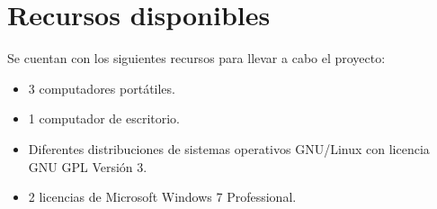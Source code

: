 \chapter{Recursos disponibles}
\label{sec:recursos}
Se cuentan con los siguientes recursos para llevar a cabo el proyecto:
\begin{itemize}
\item 3 computadores port\'atiles.
\item 1 computador de escritorio.
\item Diferentes distribuciones de sistemas operativos GNU/Linux con licencia GNU GPL Versi\'on 3.
\item 2 licencias de Microsoft Windows 7 Professional.
\end{itemize}
\pagebreak
